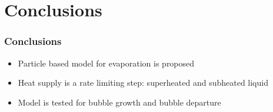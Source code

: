 \section{Conclusions}
\begin{frame}
  \frametitle{Conclusions}
  \begin{itemize}
  \item Particle based model for evaporation is proposed
  \item Heat supply is a rate limiting step: superheated and subheated
    liquid
  \item Model is tested for bubble growth and bubble departure
  \end{itemize}
\end{frame}

